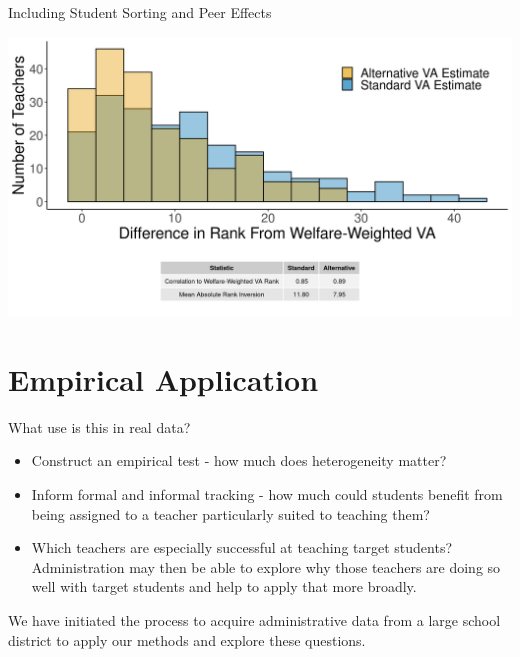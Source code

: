 \documentclass[11pt]{beamer}
\begin{document}
\begin{frame}{Including Student Sorting and Peer Effects}

    \includegraphics[width=\textwidth]{slides/Figures/np_hist_run_15.png}

\end{frame}






\section{Empirical Application}


\begin{frame}{What use is this in real data?}

    \begin{itemize}
        \item Construct an empirical test - how much does heterogeneity matter?
        \item Inform formal and informal tracking - how much could students benefit from being assigned to a teacher particularly suited to teaching them?
        \item Which teachers are especially successful at teaching target students? Administration may then be able to explore why those teachers are doing so well with target students and help to apply that more broadly.
    \end{itemize}
    
    We have initiated the process to acquire administrative data from a large school district to apply our methods and explore these questions.

\end{frame}
\end{document}
